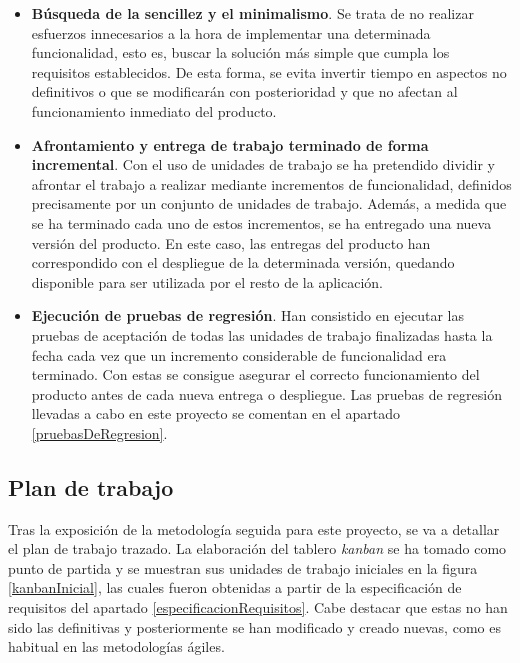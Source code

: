\documentclass[11pt,spanish,listoffigures]{tfgetsinf}
\begin{document}
\begin{itemize}
	\item \textbf{Búsqueda de la sencillez y el minimalismo}. Se trata de no realizar esfuerzos innecesarios a la hora de implementar una determinada funcionalidad, esto es, buscar la solución más simple que cumpla los requisitos establecidos. De esta forma, se evita invertir tiempo en aspectos no definitivos o que se modificarán con posterioridad y que no afectan al funcionamiento inmediato del producto.

	\item \textbf{Afrontamiento y entrega de trabajo terminado de forma incremental}. Con el uso de unidades de trabajo se ha pretendido dividir y afrontar el trabajo a realizar mediante incrementos de funcionalidad, definidos precisamente por un conjunto de unidades de trabajo. Además, a medida que se ha terminado cada uno de estos incrementos, se ha entregado una nueva versión del producto. En este caso, las entregas del producto han correspondido con el despliegue de la determinada versión, quedando disponible para ser utilizada por el resto de la aplicación.

	\item \textbf{Ejecución de pruebas de regresión}. Han consistido en ejecutar las pruebas de aceptación de todas las unidades de trabajo finalizadas hasta la fecha cada vez que un incremento considerable de funcionalidad era terminado. Con estas se consigue asegurar el correcto funcionamiento del producto antes de cada nueva entrega o despliegue. Las pruebas de regresión llevadas a cabo en este proyecto se comentan en el apartado \ref{pruebasDeRegresion}.

\end{itemize}


		\subsection{Plan de trabajo} \label{planDeTrabajo}

Tras la exposición de la metodología seguida para este proyecto, se va a detallar el plan de trabajo trazado. La elaboración del tablero \emph{kanban} se ha tomado como punto de partida y se muestran sus unidades de trabajo iniciales en la figura \ref{kanbanInicial}, las cuales fueron obtenidas a partir de la especificación de requisitos del apartado \ref{especificacionRequisitos}. Cabe destacar que estas no han sido las definitivas y posteriormente se han modificado y creado nuevas, como es habitual en las metodologías ágiles.
\end{document}
